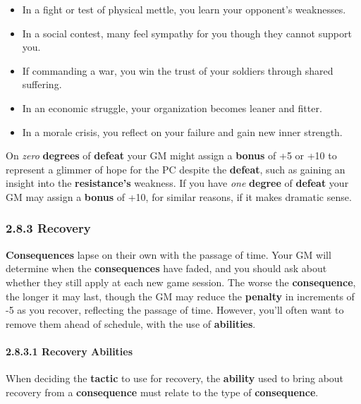 \documentclass[
  11pt,
]{article}
\providecommand{\tightlist}{%
  \setlength{\itemsep}{0pt}\setlength{\parskip}{0pt}}
\begin{document}
\begin{itemize}
\tightlist
\item
  In a fight or test of physical mettle, you learn your opponent's
  weaknesses.
\item
  In a social contest, many feel sympathy for you though they cannot
  support you.
\item
  If commanding a war, you win the trust of your soldiers through shared
  suffering.
\item
  In an economic struggle, your organization becomes leaner and fitter.
\item
  In a morale crisis, you reflect on your failure and gain new inner
  strength.
\end{itemize}

On \emph{zero} \textbf{degrees} of \textbf{defeat} your GM might assign
a \textbf{bonus} of +5 or +10 to represent a glimmer of hope for the PC
despite the \textbf{defeat}, such as gaining an insight into the
\textbf{resistance's} weakness. If you have \emph{one} \textbf{degree}
of \textbf{defeat} your GM may assign a \textbf{bonus} of +10, for
similar reasons, if it makes dramatic sense.

\hypertarget{recovery}{%
\subsubsection{2.8.3 Recovery}\label{recovery}}

\textbf{Consequences} lapse on their own with the passage of time. Your
GM will determine when the \textbf{consequences} have faded, and you
should ask about whether they still apply at each new game session. The
worse the \textbf{consequence}, the longer it may last, though the GM
may reduce the \textbf{penalty} in increments of -5 as you recover,
reflecting the passage of time. However, you'll often want to remove
them ahead of schedule, with the use of \textbf{abilities}.

\hypertarget{recovery-abilities}{%
\paragraph{2.8.3.1 Recovery Abilities}\label{recovery-abilities}}

When deciding the \textbf{tactic} to use for recovery, the
\textbf{ability} used to bring about recovery from a
\textbf{consequence} must relate to the type of \textbf{consequence}.
\end{document}
